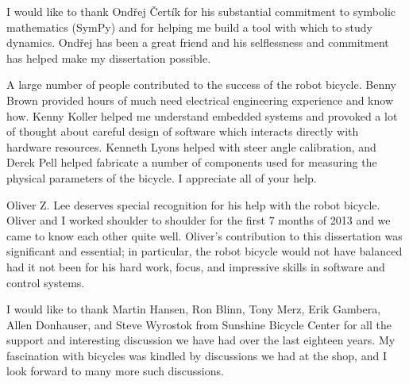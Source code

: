 I would like to thank Ondřej Čertík for his substantial commitment to symbolic
mathematics (SymPy) and for helping me build a tool with which to study
dynamics. Ondřej has been a great friend and his selflessness and commitment
has helped make my dissertation possible.

A large number of people contributed to the success of the robot bicycle. Benny
Brown provided hours of much need electrical engineering experience and know
how. Kenny Koller helped me understand embedded systems and provoked a lot of
thought about careful design of software which interacts directly with hardware
resources. Kenneth Lyons helped with steer angle calibration, and Derek Pell
helped fabricate a number of components used for measuring the physical
parameters of the bicycle. I appreciate all of your help.

Oliver Z. Lee deserves special recognition for his help with the robot bicycle.
Oliver and I worked shoulder to shoulder for the first 7 months of 2013 and we
came to know each other quite well. Oliver's contribution to this dissertation
was significant and essential; in particular, the robot bicycle would not have
balanced had it not been for his hard work, focus, and impressive skills in
software and control systems.

I would like to thank Martin Hansen, Ron Blinn, Tony Merz, Erik Gambera, Allen
Donhauser, and Steve Wyrostok from Sunshine Bicycle Center for all the support
and interesting discussion we have had over the last eighteen years. My
fascination with bicycles was kindled by discussions we had at the shop, and I
look forward to many more such discussions.

